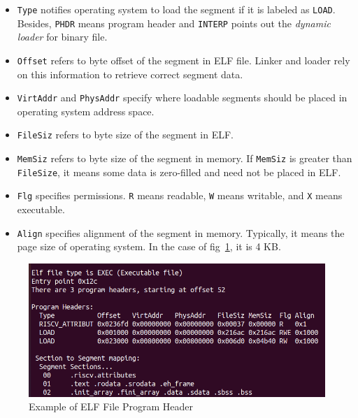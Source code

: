 \begin{itemize}
    \item \texttt{Type} notifies operating system to load the segment if it is labeled as \texttt{LOAD}. Besides, \texttt{PHDR} means program header and \texttt{INTERP} points out the \textit{dynamic loader} for binary file.
    
    \item \texttt{Offset} refers to byte offset of the segment in ELF file. Linker and loader rely on this information to retrieve correct segment data.
    
    \item \texttt{VirtAddr} and \texttt{PhysAddr} specify where loadable segments should be placed in operating system address space.
    
    \item \texttt{FileSiz} refers to byte size of the segment in ELF.
    
    \item \texttt{MemSiz} refers to byte size of the segment in memory. If \texttt{MemSiz} is greater than \texttt{FileSize}, it means some data is zero-filled and need not be placed in ELF.

    \item \texttt{Flg} specifies permissions. \texttt{R} means readable, \texttt{W} means writable, and \texttt{X} means executable.
    
    \item \texttt{Align} specifies alignment of the segment in memory. Typically, it means the page size of operating system. In the case of fig~\ref{fig:elf_program_headers_example}, it is 4 KB. 
\end{itemize}

\begin{figure}
    \centering
    \includegraphics[width=.85\linewidth]{figures/ELF_program_header.png}
    \caption{Example of ELF File Program Header}
    \label{fig:elf_program_headers_example}
\end{figure}

